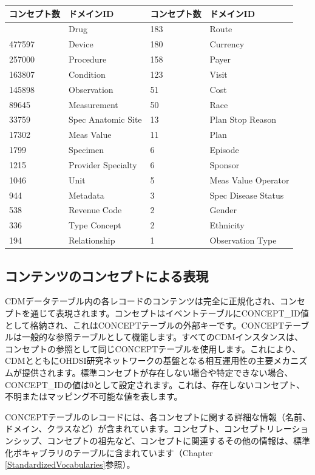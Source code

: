 \documentclass[
  11pt]{book}
\theoremstyle{definition}
\theoremstyle{definition}
\theoremstyle{definition}
\theoremstyle{definition}
\theoremstyle{remark}
\begin{document}
\begin{longtable}[]{@{}llll@{}}
\toprule\noalign{}
コンセプト数 & ドメインID & コンセプト数 & ドメインID \\
\midrule\noalign{}
\endhead
\bottomrule\noalign{}
\endlastfoot
1731378 & Drug & 183 & Route \\
477597 & Device & 180 & Currency \\
257000 & Procedure & 158 & Payer \\
163807 & Condition & 123 & Visit \\
145898 & Observation & 51 & Cost \\
89645 & Measurement & 50 & Race \\
33759 & Spec Anatomic Site & 13 & Plan Stop Reason \\
17302 & Meas Value & 11 & Plan \\
1799 & Specimen & 6 & Episode \\
1215 & Provider Specialty & 6 & Sponsor \\
1046 & Unit & 5 & Meas Value Operator \\
944 & Metadata & 3 & Spec Disease Status \\
538 & Revenue Code & 2 & Gender \\
336 & Type Concept & 2 & Ethnicity \\
194 & Relationship & 1 & Observation Type \\
\end{longtable}

\subsection{コンテンツのコンセプトによる表現}\label{ux30b3ux30f3ux30c6ux30f3ux30c4ux306eux30b3ux30f3ux30bbux30d7ux30c8ux306bux3088ux308bux8868ux73fe}

CDMデータテーブル内の各レコードのコンテンツは完全に正規化され、コンセプトを通じて表現されます。コンセプトはイベントテーブルにCONCEPT\_ID値として格納され、これはCONCEPTテーブルの外部キーです。CONCEPTテーブルは一般的な参照テーブルとして機能します。すべてのCDMインスタンスは、コンセプトの参照として同じCONCEPTテーブルを使用します。これにより、CDMとともにOHDSI研究ネットワークの基盤となる相互運用性の主要メカニズムが提供されます。標準コンセプトが存在しない場合や特定できない場合、CONCEPT\_IDの値は0として設定されます。これは、存在しないコンセプト、不明またはマッピング不可能な値を表します。

CONCEPTテーブルのレコードには、各コンセプトに関する詳細な情報（名前、ドメイン、クラスなど）が含まれています。コンセプト、コンセプトリレーションシップ、コンセプトの祖先など、コンセプトに関連するその他の情報は、標準化ボキャブラリのテーブルに含まれています（Chapter \ref{StandardizedVocabularies}参照）。
\end{document}
